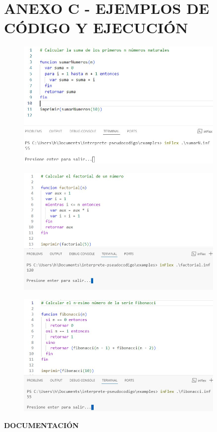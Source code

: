 \section*{ANEXO C - EJEMPLOS DE CÓDIGO Y EJECUCIÓN}
\begin{figure}[!h]
  \includegraphics*[width=0.9\textwidth]{images/apc01.png}
\end{figure}
\begin{figure}[!h]
  \includegraphics*[width=0.9\textwidth]{images/apc02.png}
\end{figure}
\begin{figure}[!h]
  \includegraphics*[width=0.9\textwidth]{images/apc03.png}
\end{figure}

\newpage
\begin{titlepage}
  \centering
  \vspace*{\fill}
  {\fontsize{46}{0} \textbf{DOCUMENTACIÓN}}
  \vspace*{\fill}
\end{titlepage}